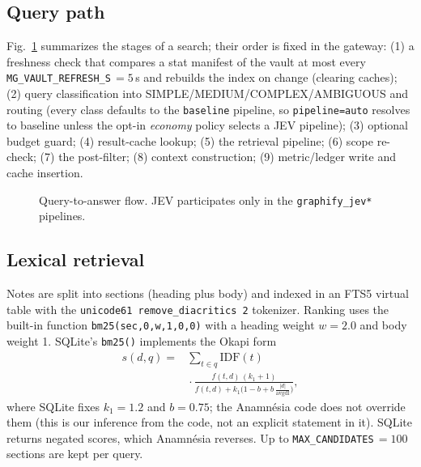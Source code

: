 \documentclass[conference,onecolumn,11pt]{IEEEtran}
\newcommand{\anam}{Anam\-n\'esia}
\begin{document}
\subsection{Query path}
Fig.~\ref{fig:flow} summarizes the stages of a search; their order is fixed in the gateway: (1) a freshness check that compares a stat manifest of the vault at most every \texttt{MG\_VAULT\_REFRESH\_S}\,$=5$\,s and rebuilds the index on change (clearing caches); (2) query classification into SIMPLE/MEDIUM/COMPLEX/AMBIGUOUS and routing (every class defaults to the \texttt{baseline} pipeline, so \texttt{pipeline=auto} resolves to baseline unless the opt-in \emph{economy} policy selects a JEV pipeline); (3) optional budget guard; (4) result-cache lookup; (5) the retrieval pipeline; (6) scope re-check; (7) the post-filter; (8) context construction; (9) metric/ledger write and cache insertion.

\begin{figure}[!htbp]\centering
{}
\caption{Query-to-answer flow. JEV participates only in the \texttt{graphify\_jev*} pipelines.}\label{fig:flow}
\end{figure}

\subsection{Lexical retrieval}
Notes are split into sections (heading plus body) and indexed in an FTS5 virtual table with the \texttt{unicode61 remove\_diacritics 2} tokenizer. Ranking uses the built-in function \texttt{bm25(sec,0,w,1,0,0)} with a heading weight $w=2.0$ and body weight 1. SQLite's \texttt{bm25()} implements the Okapi form \cite{sqlitefts5,robertson2009bm25}
\begin{equation}
\begin{aligned}
s(d,q)={}&\sum_{t\in q}\mathrm{IDF}(t)\\
&{}\cdot\frac{f(t,d)\,(k_1+1)}{f(t,d)+k_1\bigl(1-b+b\,\tfrac{|d|}{\mathrm{avgdl}}\bigr)},
\end{aligned}\label{eq:bm25}
\end{equation}
where SQLite fixes $k_1{=}1.2$ and $b{=}0.75$; the \anam{} code does not override them (this is our inference from the code, not an explicit statement in it). SQLite returns negated scores, which \anam{} reverses. Up to \texttt{MAX\_CANDIDATES}\,$=100$ sections are kept per query.
\end{document}
